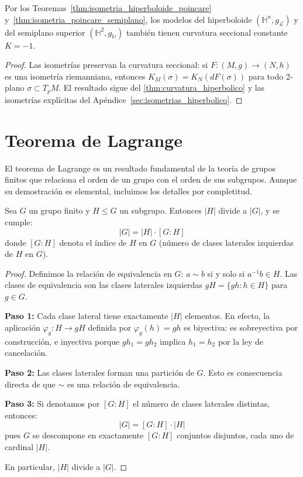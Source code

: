 \begin{corollary}\label{cor:curvatura_modelos_hiperbolicos}
Por los Teoremas~\ref{thm:isometria_hiperboloide_poincare} y~\ref{thm:isometria_poincare_semiplano}, los modelos del hiperboloide $(\mathbb{H}^n, g_{\mathcal{L}})$ y del semiplano superior $(\mathbb{H}^2, g_{\mathbb{H}})$ también tienen curvatura seccional constante $K = -1$.
\end{corollary}

\begin{proof}
Las isometrías preservan la curvatura seccional: si $F: (M, g) \to (N, h)$ es una isometría riemanniana, entonces $K_M(\sigma) = K_N(dF(\sigma))$ para todo 2-plano $\sigma \subset T_pM$. El resultado sigue del \autoref{thm:curvatura_hiperbolico} y las isometrías explícitas del Apéndice~\ref{sec:isometrias_hiperbolico}.
\end{proof}

\section{Teorema de Lagrange}\label{sec:lagrange}

El teorema de Lagrange es un resultado fundamental de la teoría de grupos finitos que relaciona el orden de un grupo con el orden de sus subgrupos. Aunque su demostración es elemental, incluimos los detalles por completitud.

\begin{theorem}[Lagrange]\label{thm:lagrange}
Sea $G$ un grupo finito y $H \leq G$ un subgrupo. Entonces $|H|$ divide a $|G|$, y se cumple:
\begin{equation}
|G| = |H| \cdot [G:H]
\end{equation}
donde $[G:H]$ denota el índice de $H$ en $G$ (número de clases laterales izquierdas de $H$ en $G$).
\end{theorem}

\begin{proof}
Definimos la relación de equivalencia en $G$: $a \sim b$ si y solo si $a^{-1}b \in H$. Las clases de equivalencia son las clases laterales izquierdas $gH = \{gh : h \in H\}$ para $g \in G$.

\textbf{Paso 1:} Cada clase lateral tiene exactamente $|H|$ elementos. En efecto, la aplicación $\varphi_g: H \to gH$ definida por $\varphi_g(h) = gh$ es biyectiva: es sobreyectiva por construcción, e inyectiva porque $gh_1 = gh_2$ implica $h_1 = h_2$ por la ley de cancelación.

\textbf{Paso 2:} Las clases laterales forman una partición de $G$. Esto es consecuencia directa de que $\sim$ es una relación de equivalencia.

\textbf{Paso 3:} Si denotamos por $[G:H]$ el número de clases laterales distintas, entonces:
\[
|G| = [G:H] \cdot |H|
\]
pues $G$ se descompone en exactamente $[G:H]$ conjuntos disjuntos, cada uno de cardinal $|H|$.

En particular, $|H|$ divide a $|G|$.
\end{proof}

